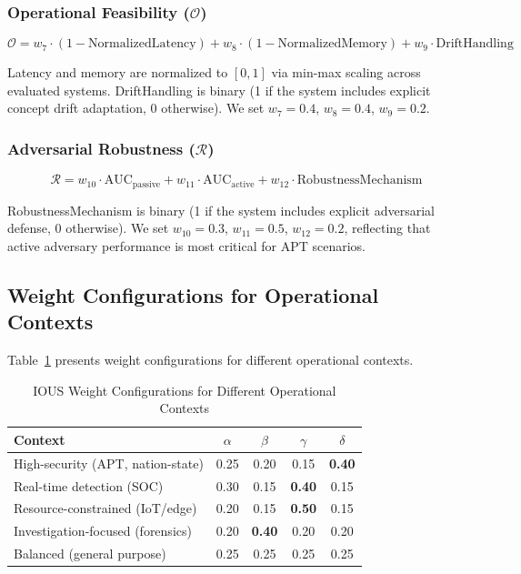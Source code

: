 \documentclass[11pt,a4paper]{article}
\begin{document}
\subsubsection{Operational Feasibility ($\mathcal{O}$)}

\begin{equation}
\mathcal{O} = w_7 \cdot (1 - \text{NormalizedLatency}) + w_8 \cdot (1 - \text{NormalizedMemory}) + w_9 \cdot \text{DriftHandling}
\end{equation}

Latency and memory are normalized to $[0, 1]$ via min-max scaling across evaluated systems. DriftHandling is binary (1 if the system includes explicit concept drift adaptation, 0 otherwise). We set $w_7 = 0.4$, $w_8 = 0.4$, $w_9 = 0.2$.

\subsubsection{Adversarial Robustness ($\mathcal{R}$)}

\begin{equation}
\mathcal{R} = w_{10} \cdot \text{AUC}_{\text{passive}} + w_{11} \cdot \text{AUC}_{\text{active}} + w_{12} \cdot \text{RobustnessMechanism}
\end{equation}

RobustnessMechanism is binary (1 if the system includes explicit adversarial defense, 0 otherwise). We set $w_{10} = 0.3$, $w_{11} = 0.5$, $w_{12} = 0.2$, reflecting that active adversary performance is most critical for APT scenarios.

\subsection{Weight Configurations for Operational Contexts}

Table~\ref{tab:weights} presents weight configurations for different operational contexts.

\begin{table}[H]
\centering
\caption{IOUS Weight Configurations for Different Operational Contexts}
\label{tab:weights}
\begin{tabular}{@{}lcccc@{}}
\toprule
\textbf{Context} & $\alpha$ & $\beta$ & $\gamma$ & $\delta$ \\
\midrule
High-security (APT, nation-state) & 0.25 & 0.20 & 0.15 & \textbf{0.40} \\
Real-time detection (SOC) & 0.30 & 0.15 & \textbf{0.40} & 0.15 \\
Resource-constrained (IoT/edge) & 0.20 & 0.15 & \textbf{0.50} & 0.15 \\
Investigation-focused (forensics) & 0.20 & \textbf{0.40} & 0.20 & 0.20 \\
Balanced (general purpose) & 0.25 & 0.25 & 0.25 & 0.25 \\
\bottomrule
\end{tabular}
\end{table}
\end{document}
